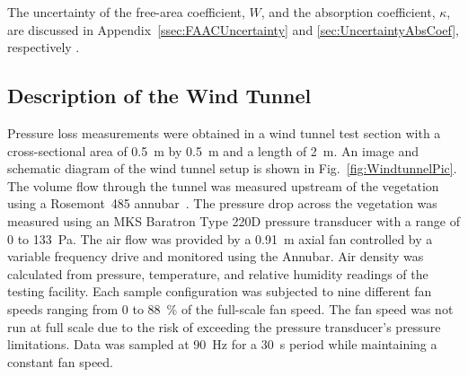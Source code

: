 \documentclass[12pt]{article}
\begin{document}
The uncertainty of the free-area coefficient, $W$, and the absorption coefficient, $\kappa$, are discussed in Appendix~\ref{ssec:FAACUncertainty} and \ref{sec:UncertaintyAbsCoef}, respectively .

\subsection{Description of the Wind Tunnel}
\label{ssec:DescirptionofWind}

Pressure loss measurements were obtained in a wind tunnel test section with a cross-sectional area of 0.5~\si{m} by 0.5~\si{m} and a length of 2~\si{m}. An image and schematic diagram of the wind tunnel setup is shown in Fig.~\ref{fig:WindtunnelPic}. The volume flow through the tunnel was measured upstream of the vegetation using a Rosemont~485 annubar~\cite{Annubar}. The pressure drop across the vegetation was measured using an MKS Baratron Type 220D pressure transducer with a range of 0 to 133~Pa. The air flow was provided by a 0.91~m axial fan controlled by a variable frequency drive and monitored using the Annubar. Air density was calculated from pressure, temperature, and relative humidity readings of the testing facility. Each sample configuration was subjected to nine different fan speeds ranging from 0 to 88~\% of the full-scale fan speed. The fan speed was not run at full scale due to the risk of exceeding the pressure transducer's pressure limitations. Data was sampled at 90~\si{Hz} for a 30~\si{s} period while maintaining a constant fan speed.
\end{document}
